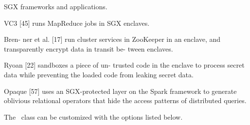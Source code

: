 SGX frameworks and applications.

VC3 [45]
runs MapReduce jobs in SGX enclaves.

Bren-
ner et al. [17] run cluster services in ZooKeeper in an
enclave, and transparently encrypt data in transit be-
tween enclaves.

Ryoan [22] sandboxes a piece of un-
trusted code in the enclave to process secret data while
preventing the loaded code from leaking secret data.

Opaque [57] uses an SGX-protected layer on the Spark
framework to generate oblivious relational operators that
hide the access patterns of distributed queries.

The \novathesis\ class can be customized with the options listed below.

\newcommand{\classoption}[3]{\textbf{#1=OPT}\qquad #2\\\qquad\emph{#3}\\}

